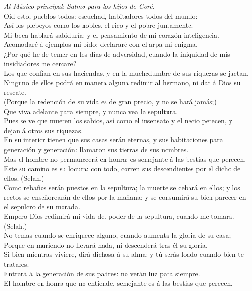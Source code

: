  \emph{Al Músico principal: Salmo para los hijos de Coré.}\\
Oid esto, pueblos todos; escuchad, habitadores todos del mundo:\\
 Así los plebeyos como los nobles, el rico y el pobre
juntamente.\\
 Mi boca hablará sabiduría; y el pensamiento de mi corazón
inteligencia.\\
 Acomodaré á ejemplos mi oído: declararé con el arpa mi
enigma.\\
 ¿Por qué he de temer en los días de adversidad, cuando la
iniquidad de mis insidiadores me cercare?\\
 Los que confían en sus haciendas, y en la muchedumbre de
sus riquezas se jactan,\\
 Ninguno de ellos podrá en manera alguna redimir al hermano,
ni dar á Dios su rescate.\\
 (Porque la redención de su vida es de gran precio, y no se
hará jamás;)\\
 Que viva adelante para siempre, y nunca vea la sepultura.\\
 Pues se ve que mueren los sabios, así como el insensato y
el necio perecen, y dejan á otros sus riquezas.\\
 En su interior tienen que sus casas serán eternas, y sus
habitaciones para generación y generación: llamaron sus tierras de sus
nombres.\\
 Mas el hombre no permanecerá en honra: es semejante á las
bestias que perecen.\\
 Este su camino es su locura: con todo, corren sus
descendientes por el dicho de ellos. (Selah.)\\
 Como rebaños serán puestos en la sepultura; la muerte se
cebará en ellos; y los rectos se enseñorearán de ellos por la mañana: y
se consumirá su bien parecer en el sepulcro de su morada.\\
 Empero Dios redimirá mi vida del poder de la sepultura,
cuando me tomará. (Selah.)\\
 No temas cuando se enriquece alguno, cuando aumenta la
gloria de su casa;\\
 Porque en muriendo no llevará nada, ni descenderá tras él
su gloria.\\
 Si bien mientras viviere, dirá dichosa á su alma: y tú
serás loado cuando bien te tratares.\\
 Entrará á la generación de sus padres: no verán luz para
siempre.\\
 El hombre en honra que no entiende, semejante es á las
bestias que perecen.

